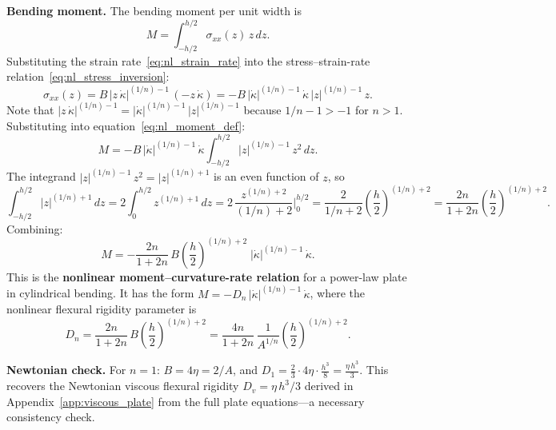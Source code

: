 \documentclass[11pt]{article}
\begin{document}
\medskip
\noindent\textbf{Bending moment.}  The bending moment per unit width is
\begin{equation}
  M = \int_{-h/2}^{h/2} \sigma_{xx}(z)\,z\,dz.
  \label{eq:nl_moment_def}
\end{equation}
Substituting the strain rate~\eqref{eq:nl_strain_rate} into the stress--strain-rate relation~\eqref{eq:nl_stress_inversion}:
\begin{equation}
  \sigma_{xx}(z) = B\,|z\,\dot{\kappa}|^{(1/n)-1}\,(-z\,\dot{\kappa}) = -B\,|\dot{\kappa}|^{(1/n)-1}\,\dot{\kappa}\,|z|^{(1/n)-1}\,z.
  \label{eq:nl_stress_z}
\end{equation}
Note that $|z\,\dot\kappa|^{(1/n)-1} = |\dot\kappa|^{(1/n)-1}\,|z|^{(1/n)-1}$ because $1/n - 1 > -1$ for $n > 1$.  Substituting into equation~\eqref{eq:nl_moment_def}:
\begin{equation}
  M = -B\,|\dot{\kappa}|^{(1/n)-1}\,\dot{\kappa}\int_{-h/2}^{h/2} |z|^{(1/n)-1}\,z^2\,dz.
  \label{eq:nl_moment_integral}
\end{equation}
The integrand $|z|^{(1/n)-1}\,z^2 = |z|^{(1/n)+1}$ is an even function of $z$, so
\begin{equation}
  \int_{-h/2}^{h/2} |z|^{(1/n)+1}\,dz = 2\int_0^{h/2} z^{(1/n)+1}\,dz = 2\,\frac{z^{(1/n)+2}}{(1/n)+2}\bigg|_0^{h/2} = \frac{2}{1/n + 2}\left(\frac{h}{2}\right)^{(1/n)+2}\!\!= \frac{2n}{1+2n}\left(\frac{h}{2}\right)^{(1/n)+2}\!\!.
  \label{eq:nl_z_integral}
\end{equation}
Combining:
\begin{equation}
  \boxed{M = -\frac{2n}{1+2n}\,B\!\left(\frac{h}{2}\right)^{(1/n)+2}\;|\dot{\kappa}|^{(1/n)-1}\,\dot{\kappa}.}
  \label{eq:nl_moment_curvature}
\end{equation}
This is the \textbf{nonlinear moment--curvature-rate relation} for a power-law plate in cylindrical bending.  It has the form $M = -D_n\,|\dot{\kappa}|^{(1/n)-1}\,\dot{\kappa}$, where the nonlinear flexural rigidity parameter is
\begin{equation}
  D_n = \frac{2n}{1+2n}\,B\!\left(\frac{h}{2}\right)^{(1/n)+2} = \frac{4n}{1+2n}\,\frac{1}{A^{1/n}}\left(\frac{h}{2}\right)^{(1/n)+2}\!\!.
  \label{eq:nl_flexural_rigidity}
\end{equation}

\noindent\textbf{Newtonian check.}  For $n = 1$: $B = 4\eta = 2/A$, and $D_1 = \frac{2}{3}\cdot 4\eta\cdot\frac{h^3}{8} = \frac{\eta\,h^3}{3}$.  This recovers the Newtonian viscous flexural rigidity $D_v = \eta\,h^3/3$ derived in Appendix~\ref{app:viscous_plate} from the full plate equations---a necessary consistency check.
\end{document}
